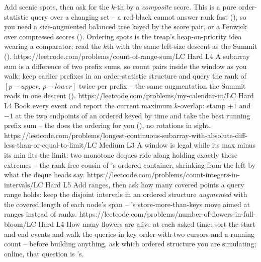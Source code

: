 \begin{mixedset}
    {Add scenic spots, then ask for the $k$-th by a \emph{composite} score. This is a pure order-statistic
    query over a changing set -- a red-black  cannot answer rank fast (), so
    you need a size-augmented balanced tree keyed by the score pair, or a Fenwick over compressed scores
    (). Ordering spots is the treap's heap-on-priority idea wearing a comparator; read the
    $k$th with the same left-size descent as the Summit ().}
    {https://leetcode.com/problems/count-of-range-sum/}{LC Hard L4}
    {A subarray sum is a difference of two prefix sums, so count pairs inside the
    window as you walk: keep earlier prefixes in an order-statistic structure and
    query the rank of $[p-\mathit{upper},\,p-\mathit{lower}]$ twice per prefix --
    the same augmentation the Summit reads in one descent ().}
    {https://leetcode.com/problems/my-calendar-iii/}{LC Hard L4}
    {Book every event and report the current maximum $k$-overlap: stamp $+1$ and
    $-1$ at the two endpoints of an ordered  keyed by time and take the
    best running prefix sum -- the  does the ordering for you
    (), no rotations in sight.}
    {https://leetcode.com/problems/longest-continuous-subarray-with-absolute-diff-less-than-or-equal-to-limit/}{LC Medium L3}
    {A window is legal while its max minus its min fits the limit: two monotone
    deques ride along holding exactly those extremes -- the rank-free cousin of
    's ordered container, shrinking from the left by what the
    deque heads say.}
    {https://leetcode.com/problems/count-integers-in-intervals/}{LC Hard L5}
    {Add ranges, then ask how many covered points a query range holds: keep the
    disjoint intervals in an ordered structure \emph{augmented} with the covered
    length of each node's span -- 's store-more-than-keys
    move aimed at ranges instead of ranks.}
    {https://leetcode.com/problems/number-of-flowers-in-full-bloom/}{LC Hard L4}
    {How many flowers are alive at each asked time: sort the start and end events
    and walk the queries in key order with two cursors and a running count --
    before building anything, ask which ordered structure you are simulating;
    online, that question is 's.}
\end{mixedset}


